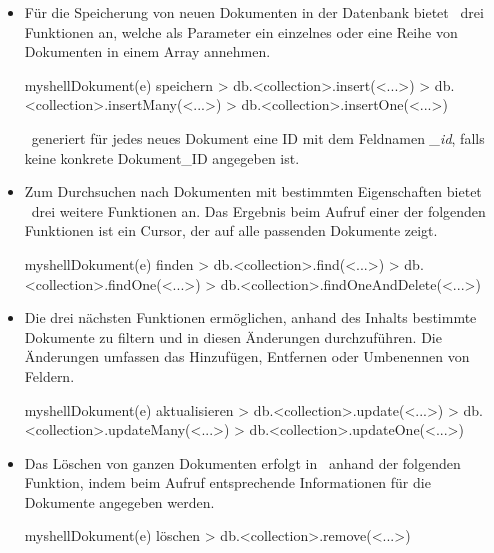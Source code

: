\begin{itemize}
\item Für die Speicherung von neuen Dokumenten in der Datenbank bietet \mongo\ drei Funktionen an, welche als Parameter ein einzelnes oder eine Reihe von Dokumenten in einem Array annehmen. %
\begin{listingsboxShell}[label={lst:insert}]{myshell}{Dokument(e) speichern}
> db.<collection>.insert(<...>)
> db.<collection>.insertMany(<...>)
> db.<collection>.insertOne(<...>)
\end{listingsboxShell}
\mongo\ generiert für jedes neues Dokument eine ID mit dem Feldnamen \textit{\_id}, falls keine konkrete Dokument\_ID angegeben ist.

\item Zum Durchsuchen nach Dokumenten mit bestimmten Eigenschaften bietet \mongo\ drei weitere Funktionen an. Das Ergebnis beim Aufruf einer der folgenden Funktionen ist ein Cursor, der auf alle passenden Dokumente zeigt.
\begin{listingsboxShell}[label={lst:find}]{myshell}{Dokument(e) finden}
> db.<collection>.find(<...>)
> db.<collection>.findOne(<...>)
> db.<collection>.findOneAndDelete(<...>)
\end{listingsboxShell}

\item Die drei nächsten Funktionen ermöglichen, anhand des Inhalts bestimmte Dokumente zu filtern und in diesen Änderungen durchzuführen. Die Änderungen umfassen das Hinzufügen, Entfernen oder Umbenennen von Feldern.
\begin{listingsboxShell}[label={lst:update}]{myshell}{Dokument(e) aktualisieren}
> db.<collection>.update(<...>)
> db.<collection>.updateMany(<...>)
> db.<collection>.updateOne(<...>)
\end{listingsboxShell}

\item Das Löschen von ganzen Dokumenten erfolgt in \mongo\ anhand der folgenden Funktion, indem beim Aufruf entsprechende Informationen für die Dokumente angegeben werden.
\begin{listingsboxShell}[label={lst:remove}]{myshell}{Dokument(e) löschen}
> db.<collection>.remove(<...>)
\end{listingsboxShell}
\end{itemize}

